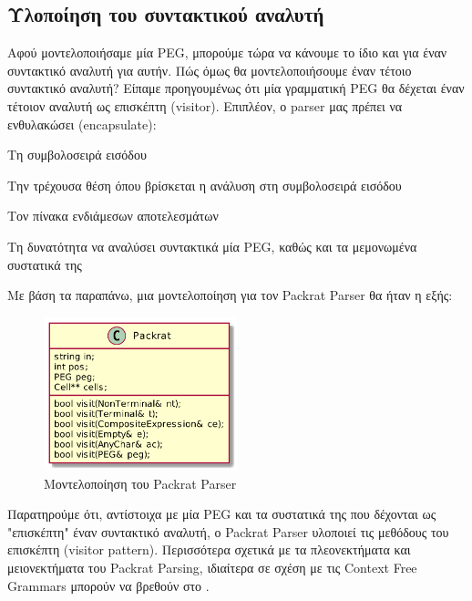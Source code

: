 \subsection{Υλοποίηση του συντακτικού αναλυτή}

Αφού μοντελοποιήσαμε μία PEG, μπορούμε τώρα να κάνουμε το ίδιο και για έναν συντακτικό αναλυτή για αυτήν. 
Πώς όμως θα μοντελοποιήσουμε έναν τέτοιο συντακτικό αναλυτή?
Είπαμε προηγουμένως ότι μία γραμματική PEG θα δέχεται έναν τέτοιον αναλυτή ως επισκέπτη (visitor).
Επιπλέον, ο parser μας πρέπει να ενθυλακώσει (encapsulate):

\begin{description}[font=$\bullet$\scshape\bfseries]
	\item Τη συμβολοσειρά εισόδου
	\item Την τρέχουσα θέση όπου βρίσκεται η ανάλυση στη συμβολοσειρά εισόδου
	\item Τον πίνακα ενδιάμεσων αποτελεσμάτων
	\item Τη δυνατότητα να αναλύσει συντακτικά μία PEG, καθώς και τα μεμονωμένα συστατικά της
\end{description}

Με βάση τα παραπάνω, μια μοντελοποίηση για τον Packrat Parser θα ήταν η εξής:

\begin{figure}[h]
    \centering
	\includegraphics[width=0.50\textwidth]{uml/packrat}
	\caption{Μοντελοποίηση του Packrat Parser}
    \label{fig:packrat_parser}
\end{figure}

\newpage
Παρατηρούμε ότι, αντίστοιχα με μία PEG και τα συστατικά της που δέχονται ως "επισκέπτη" έναν συντακτικό αναλυτή, ο Packrat Parser υλοποιεί τις μεθόδους του επισκέπτη (visitor pattern).
Περισσότερα σχετικά με τα πλεονεκτήματα και μειονεκτήματα του Packrat Parsing, ιδιαίτερα σε σχέση με τις Context Free Grammars μπορούν να βρεθούν στο \cite{Ford2004}.


